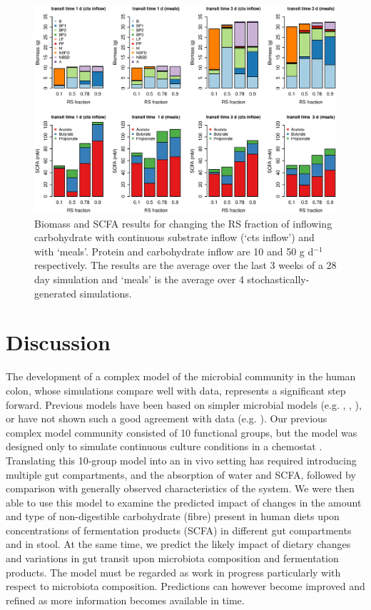 \documentclass[a4paper]{article}
\begin{document}
\begin{figure}
    \centering
    \includegraphics[scale=0.5]{images/modelledRSfrac.eps}
    \caption{Biomass and SCFA results for changing the RS fraction of inflowing carbohydrate with continuous substrate inflow (`cts inflow') and with `meals'. Protein and carbohydrate inflow are 10 and 50 g d$^{-1}$ respectively. The results are the average over the last 3 weeks of a 28 day simulation and `meals' is the average over 4 stochastically-generated simulations. 
    }
    \label{fig:modelledRSfrac}
\end{figure}







\section*{Discussion}
The development of a complex model of the microbial community in the human colon, whose simulations compare well with data, represents a significant step forward. 
Previous models have been based on simpler microbial models (e.g. \cite{Cremer17}, \cite{Munoz}, \cite{moorthy}), or have not shown such a good agreement with data (e.g. \cite{smith}).
Our previous complex model community consisted of 10 functional groups, but the model was designed only to simulate continuous culture conditions in a chemostat \citep{Kettle2015}. 
Translating this 10-group model into an in vivo setting has required introducing multiple gut compartments, and the absorption of water and SCFA, followed by comparison with generally observed characteristics of the system. 
We were then able to use this model to examine the predicted impact of changes in the amount and type of non-digestible carbohydrate (fibre) present in human diets upon concentrations of fermentation products (SCFA) in different gut compartments and in stool. At the same time, we predict the likely impact of dietary changes and variations in gut transit upon microbiota composition and fermentation products. 
The model must be regarded as work in progress particularly with respect to microbiota composition. Predictions can however become improved and refined as more information becomes available in time.
\end{document}
